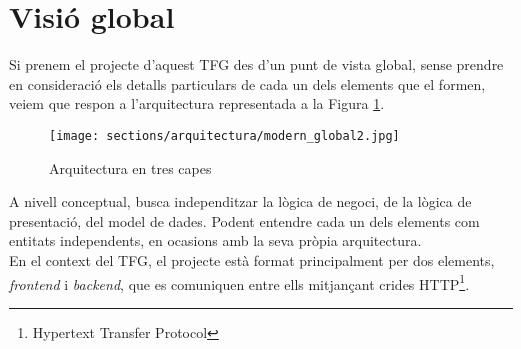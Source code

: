 \section{Visió global}
\label{arquitectura:visio_global}
Si prenem el projecte d'aquest TFG des d'un punt de vista global, sense prendre en consideració els detalls particulars de cada un dels elements que el formen, veiem que respon a l'arquitectura representada a la Figura \ref{fig:arquitectura_global}.
\begin{figure}[h!]
\texttt{[image: sections/arquitectura/modern\_global2.jpg]}
\centering
\caption{Arquitectura en tres capes}
\label{fig:arquitectura_global}
\end{figure}
\newline A nivell conceptual, busca independitzar la lògica de negoci, de la lògica de presentació, del model de dades. Podent entendre cada un dels elements com entitats independents, en ocasions amb la seva pròpia arquitectura.\\
\newline En el context del TFG, el projecte està format principalment per dos elements, \textit{frontend} i \textit{backend}, que es comuniquen entre ells mitjançant crides HTTP\footnote{Hypertext Transfer Protocol}.

\clearpage

